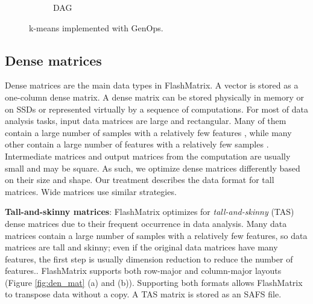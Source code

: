 \begin{figure}
\begin{subfigure}{.25\textwidth}
	\label{fig:dag}
	\caption{DAG}
	\end{subfigure}
  \vspace{-12pt}
	\caption{k-means implemented with GenOps.}
	\label{fig:kmeans}
  \vspace{-8pt}
\end{figure}

\vspace{-8pt}
\subsection{Dense matrices}
\vspace{-4pt}
Dense matrices are the main data types in FlashMatrix. A vector is stored
as a one-column dense matrix. A dense matrix can be stored
physically in memory or on SSDs or represented virtually by a sequence of
computations.
For most of data analysis tasks, input data matrices are large and rectangular.
Many of them contain a large number of samples with a relatively
few features \cite{}, while many other contain a large number of features with
a relatively few samples \cite{}. Intermediate matrices and output matrices
from the computation are usually small and may be square. As such, we optimize
dense matrices differently based on their size and shape.
Our treatment describes the data format for tall matrices. 
Wide matrices use similar strategies.

\noindent \textbf{Tall-and-skinny matrices}:
FlashMatrix optimizes for \textit{tall-and-skinny} (TAS) dense matrices due to their
frequent occurrence in data analysis. Many data matrices contain
a large number of samples with a relatively few features, so data matrices
are tall and skinny; even if the original data matrices have many features,
the first step is usually dimension reduction \cite{} to reduce the number
of features.. FlashMatrix supports both row-major and column-major
layouts (Figure \ref{fig:den_mat} (a) and (b)).  Supporting both formats
allows FlashMatrix to transpose data without a copy. A TAS matrix is stored
as an SAFS file.

